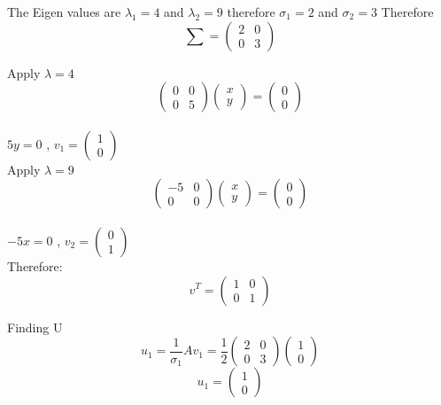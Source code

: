 \documentclass[12pt, oneside]{article}   	%
\begin{document}
\begin{enumerate}
	
	The Eigen values are $\lambda_1=4$ and $\lambda_2=9$ therefore $\sigma_1=2$ and $\sigma_2=3$ Therefore
	$$
	\sum =\left( \begin{array}{cc} 2 & 0 \\ 0 & 3  \end{array} \right) 
	$$
	
	
	Apply $\lambda= 4$\\
	$$\left( \begin{array}{cc} 0 & 0 \\ 0 & 5  \end{array} \right) \left( \begin{array}{c} x \\ y \end{array} \right) =\left( \begin{array}{c} 0 \\ 0  \end{array} \right)$$ \\
	
	$5y=0$ , $v_1= \left( \begin{array}{c} 1 \\ 0  \end{array} \right)$\\
	
	Apply $\lambda= 9$\\
	$$\left( \begin{array}{cc} -5 & 0 \\ 0 & 0 \end{array} \right) \left( \begin{array}{c} x \\ y \end{array} \right) =\left( \begin{array}{c} 0 \\ 0  \end{array} \right)$$ \\
	
	$-5x=0$ , $v_2= \left( \begin{array}{c} 0 \\ 1  \end{array} \right)$\\
	Therefore: $$v^T=\left( \begin{array}{cc}1& 0 \\0& 1  \end{array} \right)$$
	
	Finding U
	$$u_1= \frac{1}{\sigma_1}Av_1= \frac{1}{2}\left( \begin{array}{cc} 2&0 \\ 0& 3 \end{array} \right)\left( \begin{array}{c} 1 \\ 0  \end{array} \right)$$
	$$u_1= \left( \begin{array}{c} 1 \\ 0  \end{array} \right)$$
	

\end{enumerate}
\end{document}
